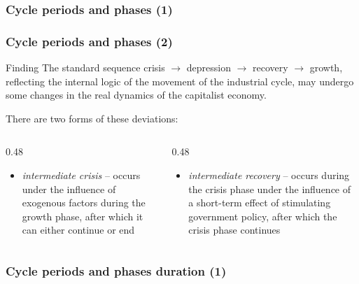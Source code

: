 \begin{frame}[t]
  \frametitle{Cycle periods and phases (1)}
  \begin{center}
  \end{center}
\end{frame}

\begin{frame}
  \frametitle{Cycle periods and phases (2)}
  \begin{alertblock}{Finding}
    The standard sequence \textquotedbl{}crisis $\to$ depression $\to$ recovery $\to$ growth\textquotedbl{}, reflecting the internal logic of the movement of the industrial cycle, may undergo some changes in the real dynamics of the capitalist economy.
  \end{alertblock}

  There are two forms of these deviations:

  \begin{columns}[T,onlytextwidth]
    \begin{column}{0.48\textwidth}
      \begin{itemize}
        \item \textit{intermediate crisis} – occurs under the influence of exogenous factors during the growth phase, after which it can either continue or end
      \end{itemize}
    \end{column}

    \begin{column}{0.48\textwidth}
      \begin{itemize}
        \item \textit{intermediate recovery} – occurs during the crisis phase under the influence of a short-term effect of stimulating government policy, after which the crisis phase continues
      \end{itemize}
    \end{column}
  \end{columns}
\end{frame}

\begin{frame}[t]
  \frametitle{Cycle periods and phases duration (1)}
  \begin{center}
  \end{center}
\end{frame}

